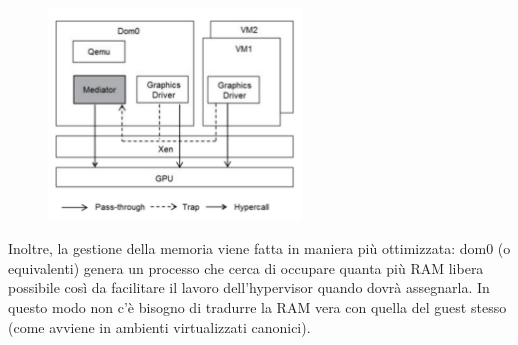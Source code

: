 \documentclass{article}
\begin{document}
		\begin{figure}[ht]
			\centering
			\includegraphics[width=0.6\textwidth]{SAC_B1_virtualizationIO_PCI.png} %
		\end{figure}
		
		Inoltre, la gestione della memoria viene fatta in maniera più ottimizzata: dom0 (o
		equivalenti) genera un processo che cerca di occupare quanta più RAM libera possibile
		così da facilitare il lavoro dell'hypervisor quando dovrà assegnarla. In questo modo non c’è
		bisogno di tradurre la RAM vera con quella del guest stesso (come avviene in
		ambienti virtualizzati canonici).
		
\end{document}

